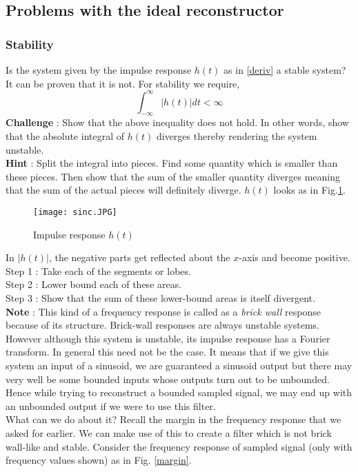 \subsection{Problems with the ideal reconstructor}
\subsubsection{Stability}
Is the system given by the impulse response $h(t)$ as in \eqref{deriv} a stable system? It can be proven that it is not. For stability we require,
\begin{equation} \label{unstable}
\int_{-\infty}^{\infty} |h(t)|dt < \infty
\end{equation}
\textbf{Challenge} : Show that the above inequality does not hold. In other words, show that the absolute integral of $h(t)$ diverges thereby rendering the system unstable. \\
\textbf{Hint} : Split the integral into pieces. Find some quantity which is smaller than these pieces. Then show that the sum of the smaller quantity diverges meaning that the sum of the actual pieces will definitely diverge. $h(t)$ looks as in Fig.\ref{impulseRes}.
\begin{figure}[h] 
	        \centering
	        \texttt{[image: sinc.JPG]}
	                \caption{Impulse response $h(t)$}
	                \label{impulseRes}
\end{figure}
In $|h(t)|$, the negative parts get reflected about the $x$-axis and become positive. \\
Step 1 : Take each of the segments or lobes. \\
Step 2 : Lower bound each of these areas. \\
Step 3 : Show that the sum of these lower-bound areas is itself divergent.\\
\textbf{Note} :  This kind of a frequency response is called as a \textit{brick wall} response because of its structure. Brick-wall responses are always unstable systems. However although this system is unstable, its impulse response has a Fourier transform. In general this need not be the case. It means that if we give this system an input of a sinusoid, we are guaranteed a sinusoid output but there may very well be some bounded inputs whose outputs turn out to be unbounded. Hence while trying to reconstruct a bounded sampled signal, we may end up with an unbounded output if we were to use this filter.\\
What can we do about it? Recall the margin in the frequency response that we asked for earlier. We can make use of this to create a filter which is not brick wall-like and stable. Consider the frequency response of sampled signal (only with frequency values shown) as in Fig. \ref{margin}. 
